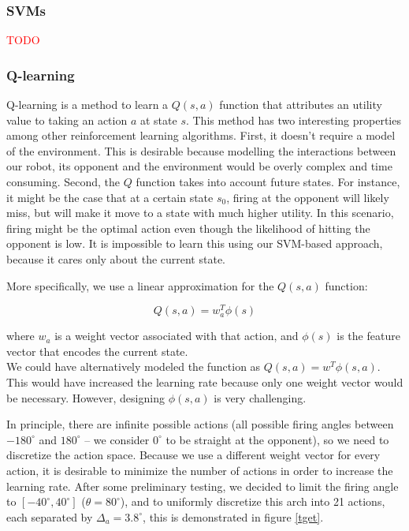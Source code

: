 \documentclass{article}
\newcommand{\xxx}[1]{\textcolor{red}{#1}}
\theoremstyle{plain}
\theoremstyle{definition}
\theoremstyle{remark}
\begin{document}
\subsubsection*{SVMs}

\xxx{TODO}

\subsubsection*{Q-learning}
Q-learning \cite{watkins92a} is a method to learn a $Q(s, a)$ function that attributes an utility value to taking an action $a$ at state $s$. This method
has two interesting properties among other reinforcement learning algorithms. First, it doesn't require a model of the environment. This is desirable because modelling the
interactions between our robot, its opponent and the environment would be overly complex and time consuming. Second, the $Q$ function
takes into account future states. For instance, it might be the case that
at a certain state $s_0$, firing at the opponent will likely miss, but will make it move to a state with much higher utility. In this scenario,
firing might be the optimal action even though the likelihood of hitting the opponent is low. It is impossible to learn this using our
SVM-based approach, because it cares only about the current state.

More specifically, we use a linear approximation for the $Q(s, a)$ function:

$$Q(s, a) = w_a^T\phi(s)$$

where $w_a$ is a weight vector associated with that action, and $\phi(s)$ is the feature vector that encodes the current state.\\

We could have alternatively modeled the function as $Q(s,a) = w^T\phi(s, a)$. This would have increased the learning rate because only
one weight vector would be necessary. However, designing $\phi(s, a)$ is very challenging.

In principle, there are infinite possible actions (all possible firing angles between $-180^{\circ} $ and $180^{\circ} $ -- we consider $0^{\circ}$ to be straight at the opponent),
so we need to discretize the
action space. Because we use a different weight vector for every action, it is desirable to minimize the number of actions in order
to increase the learning rate. After some preliminary testing, we decided to limit the firing angle to $[-40^{\circ}, 40^{\circ}]$ ($\theta = 80^{\circ}$), and to uniformly discretize this arch into
21 actions, each separated by $\Delta_a = 3.8^{\circ}$, this is demonstrated in figure \ref{tget}.
\end{document}
